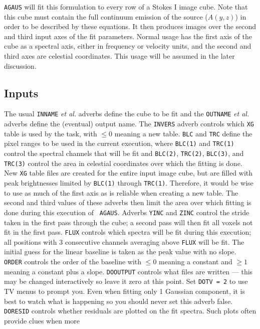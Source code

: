 \documentclass[twoside]{article}
\begin{document}
{\tt AGAUS} will fit this formulation to every row of a Stokes I image
cube.  Note that this cube must contain the full continuum emission of
the source ($A(y,z)$) in order to be described by these equations.  It
then produces images over the second and third input axes of the fit
parameters.  Normal usage has the first axis of the cube as a spectral
axis, either in frequency or velocity units, and the second and third
axes are celestial coordinates.  This usage will be assumed in the
later discussion.

\subsection{Inputs}

The usual {\tt INNAME} {\it et al.} adverbs define the cube to be fit
and the {\tt OUTNAME} {\it et al.} adverbs define the (eventual)
output name.  The {\tt INVERS} adverb controls which {\tt XG} table is
used by the task, with $\leq 0$ meaning a new table.  {\tt BLC} and
{\tt TRC} define the pixel ranges to be used in the current execution,
where {\tt BLC(1)} and {\tt TRC(1)} control the spectral channels that
will be fit and {\tt BLC(2)}, {\tt TRC(2)}, {\tt BLC(3)}, and {\tt
TRC(3)} control the area in celestial coordinates over which the
fitting is done.  New {\tt XG} table files are created for the
entire input image cube, but are filled with peak brightnesses limited
by {\tt BLC(1)} through {\tt TRC(1)}\@.  Therefore, it would be wise
to use as much of the first axis as is reliable when creating a new
table.  The second and third values of these adverbs then limit the
area over which fitting is done during this execution of {\tt
  AGAUS}\@.  Adverbs {\tt YINC} and {\tt ZINC} control the stride
taken in the first pass through the cube; a second pass will then fit
all voxels not fit in the first pass.  {\tt FLUX} controls which
spectra will be fit during this execution; all positions with 3
consecutive channels averaging above {\tt FLUX} will be fit.  The
initial guess for the linear baseline is taken as the peak value with
no slope.  {\tt ORDER} controls the order of the baseline with $\leq
0$ meaning a constant and $\ge 1$ meaning a constant plus a slope.
{\tt DOOUTPUT} controls what files are written --- this may be changed
interactively so leave it zero at this point.  Set {\tt DOTV = 2} to
use TV menus to prompt you.  Even when fitting only 1 Gaussian
component, it is best to watch what is happening so you should never
set this adverb false.  {\tt DORESID} controls whether residuals are
plotted on the fit spectra.  Such plots often provide clues when more
\end{document}
